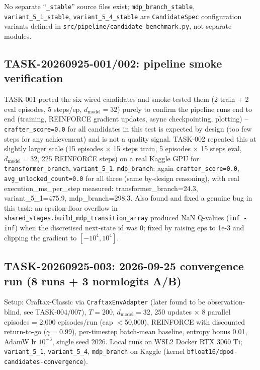 \documentclass[11pt]{article}
\newcommand{\srcpath}[1]{\texttt{\small #1}}
\begin{document}
No separate ``\texttt{\_stable}'' source files exist; \texttt{mdp\_branch\_stable}, \texttt{variant\_5\_1\_stable}, \texttt{variant\_5\_4\_stable} are \texttt{CandidateSpec} configuration variants defined in \srcpath{src/pipeline/candidate\_benchmark.py}, not separate modules.

\subsection{TASK-20260925-001/002: pipeline smoke verification}

TASK-001 ported the six wired candidates and smoke-tested them (2 train + 2 eval episodes,
5 steps/ep, $d_{\text{model}}=32$) purely to confirm the pipeline runs end to end (training,
REINFORCE gradient updates, async checkpointing, plotting) -- \texttt{crafter\_score=0.0} for all
candidates in this test is expected by design (too few steps for any achievement) and is not a
quality signal. TASK-002 repeated this at slightly larger scale (15 episodes $\times$ 15 steps
train, 5 episodes $\times$ 15 steps eval, $d_{\text{model}}=32$, 225 REINFORCE steps) on a real
Kaggle GPU for \texttt{transformer\_branch}, \texttt{variant\_5\_1}, \texttt{mdp\_branch}: again
\texttt{crafter\_score=0.0}, \texttt{avg\_unlocked\_count=0.0} for all three (same by-design
reasoning), with real execution\_ms\_per\_step measured: transformer\_branch=24.3,
variant\_5\_1=475.9, mdp\_branch=298.3. Also found and fixed a genuine bug in this task: an
epsilon-floor overflow in \srcpath{shared\_stages.build\_mdp\_transition\_array} produced NaN
Q-values (\texttt{inf - inf}) when the discretised next-state id was 0; fixed by raising eps to
1e-3 and clipping the gradient to $[-10^4,10^4]$.

\subsection{TASK-20260925-003: 2026-09-25 convergence run (8 runs + 3 normlogits A/B)}
\label{sec:convergence}

Setup: Craftax-Classic via \texttt{CraftaxEnvAdapter} (later found to be observation-blind, see
TASK-004/007), $T=200$, $d_{\text{model}}=32$, 250 updates $\times$ 8 parallel episodes = 2{,}000
episodes/run (cap $<$50{,}000), REINFORCE with discounted return-to-go ($\gamma=0.99$),
per-timestep batch-mean baseline, entropy bonus 0.01, AdamW lr $10^{-3}$, single seed 2026. Local
runs on WSL2 Docker RTX 3060 Ti; \texttt{variant\_5\_1}, \texttt{variant\_5\_4}, \texttt{mdp\_branch}
on Kaggle (kernel \texttt{bfloat16/dpod-candidates-convergence}).
\end{document}
